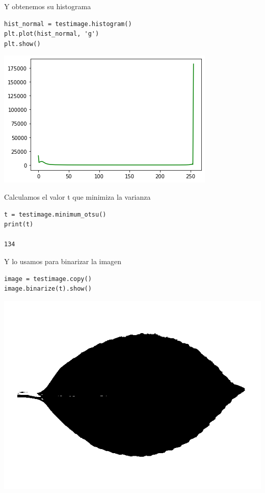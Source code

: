 \documentclass[letter]{article}
\begin{document}
Y obtenemos su histograma

\begin{verbatim}
hist_normal = testimage.histogram()
plt.plot(hist_normal, 'g')
plt.show()
\end{verbatim}

\begin{center}
\includegraphics[width=.9\linewidth]{./images/hist.png}
\end{center}

Calculamos el valor t que minimiza la varianza

\begin{verbatim}
t = testimage.minimum_otsu()
print(t)

134
\end{verbatim}

Y lo usamos para binarizar la imagen

\begin{verbatim}
image = testimage.copy()
image.binarize(t).show()
\end{verbatim}

\begin{center}
\includegraphics[width=.9\linewidth]{./images/testbin.png}
\end{center}
\end{document}
